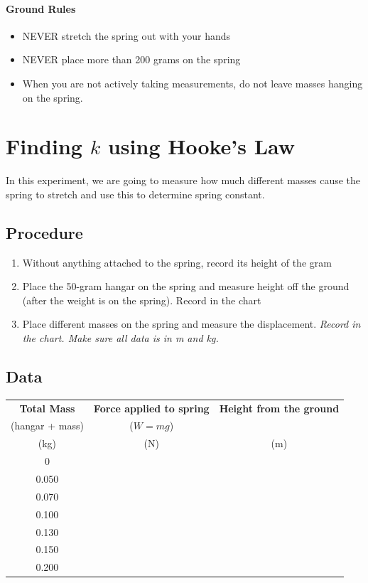 \documentclass[10pt]{exam}
\begin{document}
\paragraph{Ground Rules} \hfill
\begin{itemize}[topsep=0pt,itemsep=-1ex,partopsep=1ex,parsep=1ex]
  \item NEVER stretch the spring out with your hands
  \item NEVER place more than 200 grams on the spring
  \item When you are not actively taking measurements, do not leave masses hanging on the spring.
\end{itemize}

\section{Finding $k$ using Hooke’s Law}

In this experiment, we are going to measure how much different masses cause the spring to stretch and use this to determine spring constant.

\subsection*{Procedure}
\begin{enumerate}[topsep=0pt,itemsep=-1ex,partopsep=1ex,parsep=1ex]
  \item Without anything attached to the spring, record its height of the gram
  \item Place the 50-gram hangar on the spring and measure height off the ground (after the weight is on the spring).  Record in the chart
  \item Place different masses on the spring and measure the displacement.  \emph{Record in the chart.  Make sure all data is in m and kg.}
\end{enumerate}

\subsection*{Data}

\begin{tabular}{|c|c|c|}
  \hline
  \bf Total Mass & \bf Force applied to spring & \bf Height from the ground \\
  (hangar + mass) & ($W=mg$) &  \\
  (kg) & (N) & (m) \\\hline
  0 & & \\[1em]\hline
  0.050 & & \\[1em]\hline
  0.070 & & \\[1em]\hline
  0.100 & & \\[1em]\hline
  0.130 & & \\[1em]\hline
  0.150 & & \\[1em]\hline
  0.200 & & \\[1em]\hline

\end{tabular}
\end{document}
